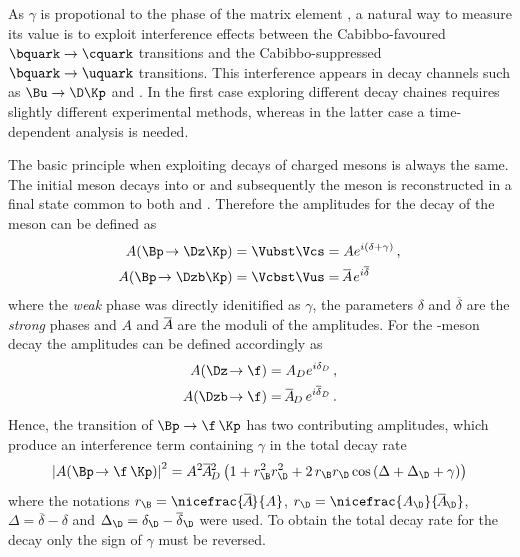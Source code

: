 As $\gamma$ is propotional to the phase of the matrix element \Vub, a natural way to measure its value is to exploit interference effects between the Cabibbo-favoured $\bquark\to\cquark$ transitions and the Cabibbo-suppressed $\bquark\to\uquark$ transitions.
This interference appears in decay channels such as $\Bu\to\D\Kp$ and \BsToDsK.
In the first case exploring different \D decay chaines requires slightly different experimental methods, whereas in the latter case a time-dependent analysis is needed.

The basic principle when exploiting decays of charged \B mesons is always the same.
The initial \Bpm meson decays into \Dz\Kpm or \Dzb\Kpm and subsequently the \D meson is reconstructed in a final state common to both \Dz and \Dzb.
Therefore the amplitudes for the decay of the \B meson can be defined as
\begin{equation}
\begin{aligned}
A\!\left(\Bp\!\to\Dz\Kp\right)&=\Vubst\Vcs=Ae^{i\left(\delta+\gamma\right)}\,,\\
A\!\left(\Bp\!\to\Dzb\Kp\right)&=\Vcbst\Vus=\overline{\kern -1.0pt A\kern -1.0pt}\,e^{i\overline{\delta}}\label{eq:ChargedBDecay}
\end{aligned}
\end{equation}
where the \emph{weak} phase was directly idenitified as $\gamma$, the parameters $\delta$ and $\overline{\delta}$ are the \emph{strong} phases and $A$ and $\overline{\kern -1.0pt A\kern -1.0pt}$ are the moduli of the amplitudes.
For the \D-meson decay the amplitudes can be defined accordingly as
\begin{equation}
\begin{aligned}
A\!\left(\Dz\!\to\f\right)&=A_De^{i\delta_D}\,,\\
A\!\left(\Dzb\!\to\f\right)&=\overline{\kern -1.0pt A\kern -1.0pt}_D\,e^{i\overline{\delta}_D}\,.
\end{aligned}
\end{equation}
Hence, the transition of $\Bp\to\f\,\Kp$ has two contributing amplitudes, which produce an interference term containing $\gamma$ in the total decay rate
\begin{equation}
\left|A\!\left(\Bp\!\to\f\,\Kp\right)\right|^2=A^2\overline{\kern -1.0pt A\kern -1.0pt}{}_D^2\left(1+r_\B^2r_\D^2+2\,r_\B r_\D\cos\left(\Delta+\Delta_\D+\gamma\right)\right)\label{eq:totDecRateChargedB}
\end{equation}
where the notations $r_\B=\nicefrac{\overline{\kern -1.0pt A\kern -1.0pt}}{A}$, $r_\D=\nicefrac{A_\D}{\overline{\kern -1.0pt A\kern -1.0pt}_\D}$, $\Delta=\overline{\delta}-\delta$ and $\Delta_\D=\delta_\D-\overline{\delta}_\D$ were used.
To obtain the total decay rate for the \Bm decay only the sign of $\gamma$ must be reversed.

